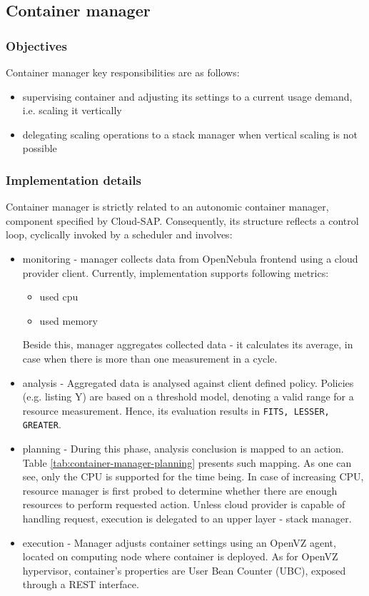 \subsection{Container manager}

\subsubsection{Objectives}
Container manager key responsibilities are as follows:
\begin{itemize}
 \item supervising container and adjusting its settings to a current usage demand, i.e. scaling it vertically
 \item delegating scaling operations to a stack manager when vertical scaling is not possible
\end{itemize}

\subsubsection{Implementation details}
Container manager is strictly related to an autonomic container manager, component specified by Cloud-SAP. Consequently, its structure reflects a control loop, cyclically invoked by a scheduler and involves:
\begin{itemize}
 \item monitoring - manager collects data from OpenNebula frontend using a cloud provider client. Currently, implementation supports following metrics:
    \begin{itemize}
     \item used cpu
     \item used memory
    \end{itemize}
    Beside this, manager aggregates collected data - it calculates its average, in case when there is more than one measurement in a cycle.
    
 \item analysis - Aggregated data is analysed against client defined policy. Policies (e.g. listing Y) are based on a threshold model, denoting a valid range for a resource measurement. Hence, its evaluation results in \texttt{FITS, LESSER, GREATER}.
 
 \item planning - During this phase, analysis conclusion is mapped to an action. Table \ref{tab:container-manager-planning} presents such mapping. As one can see, only the CPU is supported for the time being. In case of increasing CPU, resource manager is first probed to determine whether there are enough resources to perform requested action. Unless cloud provider is capable of handling request, execution is delegated to an upper layer - stack manager.
 
 \item execution - Manager adjusts container settings using an OpenVZ agent, located on computing node where container is deployed. As for OpenVZ hypervisor, container's properties are User Bean Counter (UBC), exposed through a REST interface.
\end{itemize}

